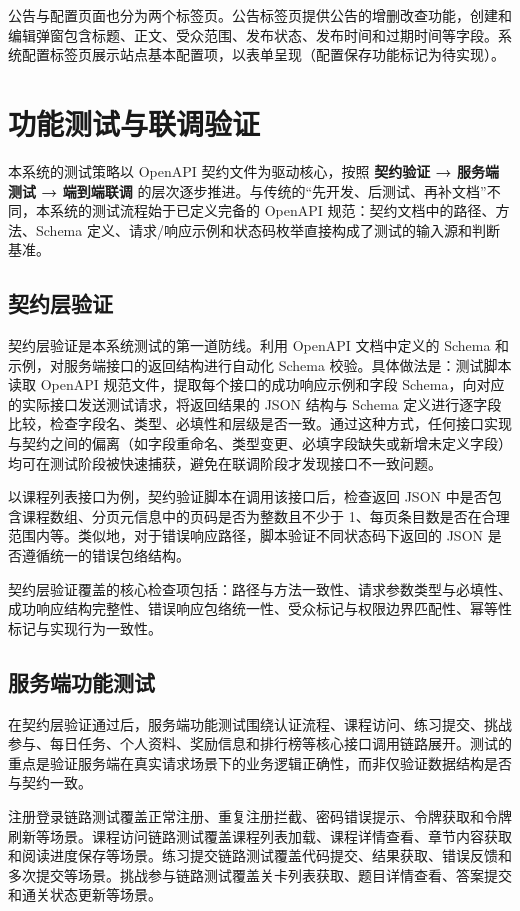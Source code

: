 公告与配置页面也分为两个标签页。公告标签页提供公告的增删改查功能，创建和编辑弹窗包含标题、正文、受众范围、发布状态、发布时间和过期时间等字段。系统配置标签页展示站点基本配置项，以表单呈现（配置保存功能标记为待实现）。

\section{功能测试与联调验证}

本系统的测试策略以 OpenAPI 契约文件为驱动核心，按照 \textbf{契约验证 → 服务端测试 → 端到端联调} 的层次逐步推进。与传统的“先开发、后测试、再补文档”不同，本系统的测试流程始于已定义完备的 OpenAPI 规范：契约文档中的路径、方法、Schema 定义、请求/响应示例和状态码枚举直接构成了测试的输入源和判断基准。

\subsection*{契约层验证}

契约层验证是本系统测试的第一道防线。利用 OpenAPI 文档中定义的 Schema 和示例，对服务端接口的返回结构进行自动化 Schema 校验。具体做法是：测试脚本读取 OpenAPI 规范文件，提取每个接口的成功响应示例和字段 Schema，向对应的实际接口发送测试请求，将返回结果的 JSON 结构与 Schema 定义进行逐字段比较，检查字段名、类型、必填性和层级是否一致。通过这种方式，任何接口实现与契约之间的偏离（如字段重命名、类型变更、必填字段缺失或新增未定义字段）均可在测试阶段被快速捕获，避免在联调阶段才发现接口不一致问题。

以课程列表接口为例，契约验证脚本在调用该接口后，检查返回 JSON 中是否包含课程数组、分页元信息中的页码是否为整数且不少于 1、每页条目数是否在合理范围内等。类似地，对于错误响应路径，脚本验证不同状态码下返回的 JSON 是否遵循统一的错误包络结构。

契约层验证覆盖的核心检查项包括：路径与方法一致性、请求参数类型与必填性、成功响应结构完整性、错误响应包络统一性、受众标记与权限边界匹配性、幂等性标记与实现行为一致性。

\subsection*{服务端功能测试}

在契约层验证通过后，服务端功能测试围绕认证流程、课程访问、练习提交、挑战参与、每日任务、个人资料、奖励信息和排行榜等核心接口调用链路展开。测试的重点是验证服务端在真实请求场景下的业务逻辑正确性，而非仅验证数据结构是否与契约一致。

注册登录链路测试覆盖正常注册、重复注册拦截、密码错误提示、令牌获取和令牌刷新等场景。课程访问链路测试覆盖课程列表加载、课程详情查看、章节内容获取和阅读进度保存等场景。练习提交链路测试覆盖代码提交、结果获取、错误反馈和多次提交等场景。挑战参与链路测试覆盖关卡列表获取、题目详情查看、答案提交和通关状态更新等场景。

